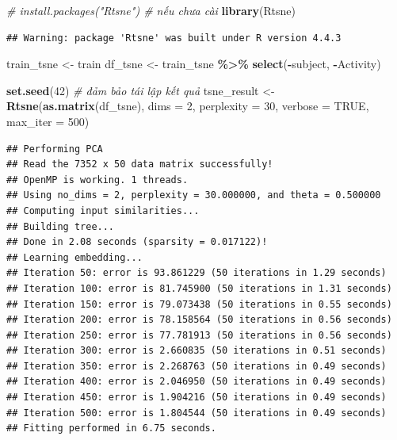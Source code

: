 \documentclass[
]{article}
\newenvironment{Shaded}{\begin{snugshade}}{\end{snugshade}}
\newcommand{\AttributeTok}[1]{\textcolor[rgb]{0.13,0.29,0.53}{#1}}
\newcommand{\CommentTok}[1]{\textcolor[rgb]{0.56,0.35,0.01}{\textit{#1}}}
\newcommand{\ConstantTok}[1]{\textcolor[rgb]{0.56,0.35,0.01}{#1}}
\newcommand{\DecValTok}[1]{\textcolor[rgb]{0.00,0.00,0.81}{#1}}
\newcommand{\FunctionTok}[1]{\textcolor[rgb]{0.13,0.29,0.53}{\textbf{#1}}}
\newcommand{\NormalTok}[1]{#1}
\newcommand{\OtherTok}[1]{\textcolor[rgb]{0.56,0.35,0.01}{#1}}
\newcommand{\SpecialCharTok}[1]{\textcolor[rgb]{0.81,0.36,0.00}{\textbf{#1}}}
\begin{document}
\begin{Shaded}
\begin{Highlighting}[]
\CommentTok{\# install.packages("Rtsne")  \# nếu chưa cài}
\FunctionTok{library}\NormalTok{(Rtsne)}
\end{Highlighting}
\end{Shaded}

\begin{verbatim}
## Warning: package 'Rtsne' was built under R version 4.4.3
\end{verbatim}

\begin{Shaded}
\begin{Highlighting}[]
\NormalTok{train\_tsne }\OtherTok{\textless{}{-}}\NormalTok{ train}
\NormalTok{df\_tsne }\OtherTok{\textless{}{-}}\NormalTok{ train\_tsne }\SpecialCharTok{\%\textgreater{}\%} \FunctionTok{select}\NormalTok{(}\SpecialCharTok{{-}}\NormalTok{subject, }\SpecialCharTok{{-}}\NormalTok{Activity)}

\FunctionTok{set.seed}\NormalTok{(}\DecValTok{42}\NormalTok{)  }\CommentTok{\# đảm bảo tái lập kết quả}
\NormalTok{tsne\_result }\OtherTok{\textless{}{-}} \FunctionTok{Rtsne}\NormalTok{(}\FunctionTok{as.matrix}\NormalTok{(df\_tsne), }\AttributeTok{dims =} \DecValTok{2}\NormalTok{, }\AttributeTok{perplexity =} \DecValTok{30}\NormalTok{, }\AttributeTok{verbose =} \ConstantTok{TRUE}\NormalTok{, }\AttributeTok{max\_iter =} \DecValTok{500}\NormalTok{)}
\end{Highlighting}
\end{Shaded}

\begin{verbatim}
## Performing PCA
## Read the 7352 x 50 data matrix successfully!
## OpenMP is working. 1 threads.
## Using no_dims = 2, perplexity = 30.000000, and theta = 0.500000
## Computing input similarities...
## Building tree...
## Done in 2.08 seconds (sparsity = 0.017122)!
## Learning embedding...
## Iteration 50: error is 93.861229 (50 iterations in 1.29 seconds)
## Iteration 100: error is 81.745900 (50 iterations in 1.31 seconds)
## Iteration 150: error is 79.073438 (50 iterations in 0.55 seconds)
## Iteration 200: error is 78.158564 (50 iterations in 0.56 seconds)
## Iteration 250: error is 77.781913 (50 iterations in 0.56 seconds)
## Iteration 300: error is 2.660835 (50 iterations in 0.51 seconds)
## Iteration 350: error is 2.268763 (50 iterations in 0.49 seconds)
## Iteration 400: error is 2.046950 (50 iterations in 0.49 seconds)
## Iteration 450: error is 1.904216 (50 iterations in 0.49 seconds)
## Iteration 500: error is 1.804544 (50 iterations in 0.49 seconds)
## Fitting performed in 6.75 seconds.
\end{verbatim}
\end{document}
